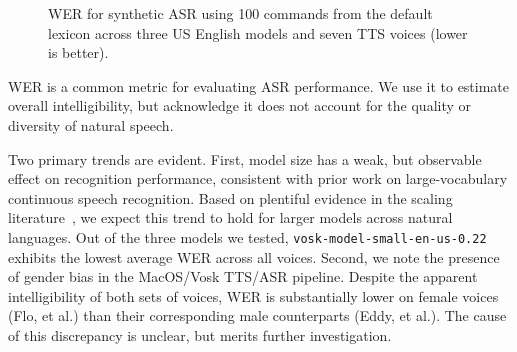 \documentclass[conference]{IEEEtran}
\begin{document}
\begin{figure}[ht!]
    \centering
    \begin{table}
    \end{table}
    \caption{WER for synthetic ASR using 100 commands from the default lexicon across three US English models and seven TTS voices (lower is better).}
    \label{fig:fig1}
\end{figure}

WER is a common metric for evaluating ASR performance. We use it to estimate overall intelligibility, but acknowledge it does not account for the quality or diversity of natural speech.

Two primary trends are evident. First, model size has a weak, but observable effect on recognition performance, consistent with prior work on large-vocabulary continuous speech recognition. Based on plentiful evidence in the scaling literature~\cite{droppo2021scaling}, we expect this trend to hold for larger models across natural languages. Out of the three models we tested, \texttt{vosk-model-small-en-us-0.22} exhibits the lowest average WER across all voices. Second, we note the presence of gender bias in the MacOS/Vosk TTS/ASR pipeline. Despite the apparent intelligibility of both sets of voices, WER is substantially lower on female voices (Flo, et al.) than their corresponding male counterparts (Eddy, et al.). The cause of this discrepancy is unclear, but merits further investigation.
\end{document}
